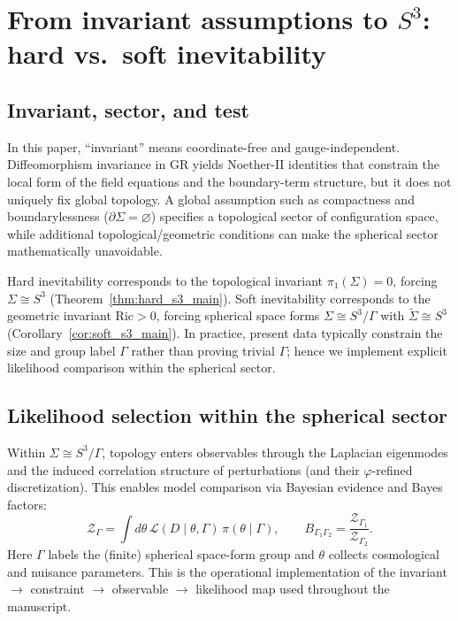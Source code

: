 \documentclass[
  reprint,
  amsmath,amssymb,
  aps,
  prd,
  superscriptaddress,
  nofootinbib,
  longbibliography
]{revtex4-2}
\newcommand{\phig}{\varphi}
\newcommand{\Sthree}{S^{3}}
\newcommand{\Sig}{\Sigma}
\theoremstyle{definition}
\theoremstyle{remark}
\begin{document}
\appendix

\section{\texorpdfstring{From invariant assumptions to $S^{3}$: hard vs.\ soft inevitability}{From invariant assumptions to S3: hard vs soft inevitability}}
\label{app:hard_soft_s3}

\subsection{Invariant, sector, and test}
\label{app:invariant_sector_test}
In this paper, ``invariant'' means coordinate-free and gauge-independent. Diffeomorphism invariance in GR
yields Noether-II identities that constrain the local form of the field equations and the boundary-term
structure, but it does not uniquely fix global topology. A global assumption such as compactness and
boundarylessness ($\partial\Sig=\varnothing$) specifies a topological sector of configuration space, while
additional topological/geometric conditions can make the spherical sector mathematically unavoidable.

Hard inevitability corresponds to the topological invariant $\pi_1(\Sig)=0$, forcing $\Sig\cong \Sthree$
(Theorem~\ref{thm:hard_s3_main}). Soft inevitability corresponds to the geometric invariant $\mathrm{Ric}>0$,
forcing spherical space forms $\Sig\cong \Sthree/\Gamma$ with $\widetilde{\Sig}\cong \Sthree$
(Corollary~\ref{cor:soft_s3_main}). In practice, present data typically constrain the size and group label
$\Gamma$ rather than proving trivial $\Gamma$; hence we implement explicit likelihood comparison within the
spherical sector.

\subsection{Likelihood selection within the spherical sector}
\label{app:likelihood_spherical_sector}
Within $\Sig\cong \Sthree/\Gamma$, topology enters observables through the Laplacian eigenmodes and the induced
correlation structure of perturbations (and their $\phig$-refined discretization). This enables model
comparison via Bayesian evidence and Bayes factors:
\begin{equation}
\mathcal{Z}_{\Gamma}=\int d\theta\, \mathcal{L}(D\mid \theta,\Gamma)\,\pi(\theta\mid \Gamma),
\qquad
B_{\Gamma_1\Gamma_2}=\frac{\mathcal{Z}_{\Gamma_1}}{\mathcal{Z}_{\Gamma_2}}.
\end{equation}
Here $\Gamma$ labels the (finite) spherical space-form group and $\theta$ collects cosmological and nuisance
parameters. This is the operational implementation of the invariant $\to$ constraint $\to$ observable $\to$
likelihood map used throughout the manuscript.
\end{document}
